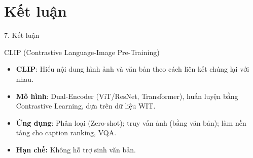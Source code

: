 \section{Kết luận}
\begin{frame}{7. Kết luận}
    \begin{block}{CLIP (Contrastive Language-Image Pre-Training)}
    \begin{itemize}
        \item \textbf{CLIP}: Hiểu nội dung hình ảnh và văn bản theo cách liên kết chúng lại với nhau.
        \item \textbf{Mô hình}: Dual-Encoder (ViT/ResNet, Transformer), huấn luyện bằng Contrastive Learning, dựa trên dữ liệu WIT.
        \item \textbf{Ứng dụng}: Phân loại (Zero-shot); truy vấn ảnh (bằng văn bản); làm nền tảng cho caption ranking, VQA.
        \item \textbf{Hạn chế:} Không hỗ trợ sinh văn bản.
    \end{itemize}
  \end{block}
\end{frame}
